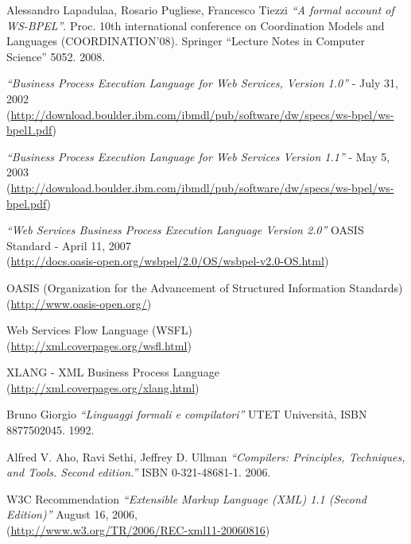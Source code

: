 \begin{thebibliography}{99}

 Alessandro Lapadulaa, Rosario Pugliese, Francesco
Tiezzi \emph{``A formal account of WS-BPEL''}. Proc. 10th international
conference on Coordination Models and Languages (COORDINATION'08). Springer ``Lecture Notes in Computer Science''
5052. 2008.

 \emph{``Business Process Execution Language for Web Services,
Version 1.0''} - July 31, 2002 \\
(\href{http://download.boulder.ibm.com/ibmdl/pub/software/dw/specs/ws-bpel/ws-bpel1.pdf}{http://download.boulder.ibm.com/ibmdl/pub/software/dw/specs/ws-bpel/ws-bpel1.pdf})

 \emph{``Business Process Execution Language for Web
Services Version 1.1''} - May 5, 2003 \\
(\href{http://download.boulder.ibm.com/ibmdl/pub/software/dw/specs/ws-bpel/ws-bpel.pdf}{http://download.boulder.ibm.com/ibmdl/pub/software/dw/specs/ws-bpel/ws-bpel.pdf})

 \emph{``Web Services Business Process Execution Language
Version 2.0''} OASIS Standard - April 11, 2007 \\
(\href{http://docs.oasis-open.org/wsbpel/2.0/OS/wsbpel-v2.0-OS.html}{http://docs.oasis-open.org/wsbpel/2.0/OS/wsbpel-v2.0-OS.html})

 OASIS (Organization for the Advancement of Structured
Information Standards)\\
(\href{http://www.oasis-open.org/}{http://www.oasis-open.org/})

 Web Services Flow Language (WSFL)\\
(\href{http://xml.coverpages.org/wsfl.html}{http://xml.coverpages.org/wsfl.html})

 XLANG - XML Business Process Language \\
(\href{http://xml.coverpages.org/xlang.html}{http://xml.coverpages.org/xlang.html})

 Bruno Giorgio \emph{``Linguaggi formali e compilatori''} 
UTET Università, ISBN 8877502045. 1992.

 Alfred V. Aho, Ravi Sethi, Jeffrey D. Ullman
\emph{``Compilers: Principles, Techniques, and Tools. Second edition.''} ISBN
0-321-48681-1. 2006.

 W3C Recommendation \emph{``Extensible Markup Language (XML) 1.1
(Second Edition)''} August 16, 2006,\\
(\href{http://www.w3.org/TR/2006/REC-xml11-20060816}{http://www.w3.org/TR/2006/REC-xml11-20060816})


\end{thebibliography}
